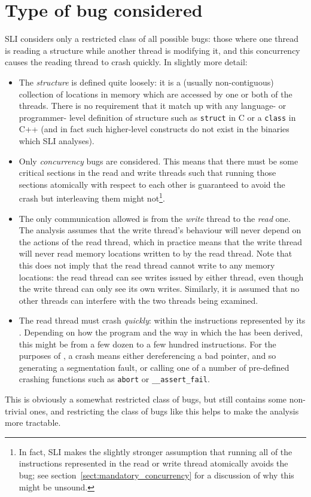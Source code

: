 \section{Type of bug considered}

SLI considers only a restricted class of all possible bugs: those
where one thread is reading a structure while another thread is
modifying it, and this concurrency causes the reading thread to crash
quickly.  In slightly more detail:

\begin{itemize}
\item The \emph{structure} is defined quite loosely: it is a (usually
  non-contiguous) collection of locations in memory which are accessed
  by one or both of the threads.  There is no requirement that it
  match up with any language- or programmer- level definition of
  structure such as \verb|struct| in C or a \verb|class| in C++ (and
  in fact such higher-level constructs do not exist in the binaries
  which SLI analyses).
\item Only \emph{concurrency} bugs are considered.  This means that
  there must be some critical sections in the read and write threads
  such that running those sections atomically with respect to each
  other is guaranteed to avoid the crash but interleaving them might
  not\footnote{In fact, SLI makes the slightly stronger assumption
  that running all of the instructions represented in the read or
  write thread {\StateMachines} atomically avoids the bug; see
  section~\ref{sect:mandatory_concurrency} for a discussion of why
  this might be unsound.}.  
\item The only communication allowed is from the \emph{write} thread
  to the \emph{read} one.  The analysis assumes that the write
  thread's behaviour will never depend on the actions of the read
  thread, which in practice means that the write thread will never
  read memory locations written to by the read thread.  Note that this
  does not imply that the read thread cannot write to any memory
  locations: the read thread can see writes issued by either thread,
  even though the write thread can only see its own writes.
  Similarly, it is assumed that no other threads can interfere with
  the two threads being examined.
\item The read thread must crash \emph{quickly}: within the
  instructions represented by its \StateMachine.  Depending on how the
  program and the way in which the \StateMachine has been derived,
  this might be from a few dozen to a few hundred instructions.  For
  the purposes of \implementation, a crash means either dereferencing
  a bad pointer, and so generating a segmentation fault, or calling
  one of a number of pre-defined crashing functions such as
  \verb|abort| or \verb|__assert_fail|.
\end{itemize}

This is obviously a somewhat restricted class of bugs, but still
contains some non-trivial ones, and restricting the class of bugs like
this helps to make the analysis more tractable.

